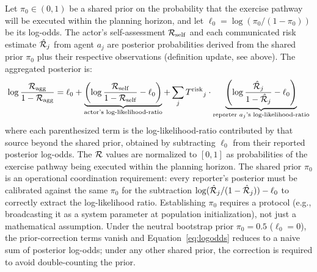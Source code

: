\begin{definition}
\label{def:logodds}
Let $\pi_0 \in (0, 1)$ be a shared prior on the probability that the
    exercise pathway will be executed within the planning horizon, and
    let $\ell_0 = \log(\pi_0 / (1 - \pi_0))$ be its log-odds. The
    actor's self-assessment $\mathcal{R}_{\mathrm{self}}$ and each communicated
    risk estimate $\hat{\mathcal{R}}_j$ from agent $a_j$ are posterior
    probabilities derived from the shared prior $\pi_0$ plus their
    respective observations (definition update, see above). The aggregated posterior is:
\begin{equation}
\label{eq:logodds}
\log \frac{\mathcal{R}_{\mathrm{agg}}}{1 - \mathcal{R}_{\mathrm{agg}}}
    = \ell_0
    + \underbrace{\left(\log \frac{\mathcal{R}_{\mathrm{self}}}{1 - \mathcal{R}_{\mathrm{self}}} - \ell_0\right)}_{\text{actor's log-likelihood-ratio}}
    + \sum_j {T^{\mathrm{risk}}}_j \cdot \underbrace{\left(\log \frac{\hat{\mathcal{R}}_j}{1 - \hat{\mathcal{R}}_j} - \ell_0\right)}_{\text{reporter $a_j$'s log-likelihood-ratio}}
\end{equation}
where each parenthesized term is the log-likelihood-ratio contributed
    by that source beyond the shared prior, obtained by subtracting
    $\ell_0$ from their reported posterior log-odds. The $\mathcal{R}$ values
    are normalized to $[0, 1]$ as probabilities of the exercise pathway
    being executed within the planning horizon. The shared prior
    $\pi_0$ is an operational coordination requirement: every
    reporter's posterior must be calibrated against the same $\pi_0$
    for the subtraction $\log(\hat{\mathcal{R}}_j / (1 - \hat{\mathcal{R}}_j))
    - \ell_0$ to correctly extract the log-likelihood ratio.
    Establishing $\pi_0$ requires a protocol (e.g., broadcasting it
    as a system parameter at population initialization), not just a
    mathematical assumption.
    Under the neutral
    bootstrap prior $\pi_0 = 0.5$ ($\ell_0 = 0$), the prior-correction
    terms vanish and Equation~\eqref{eq:logodds} reduces to a naive
    sum of posterior log-odds; under any other shared prior, the
    correction is required to avoid double-counting the prior.
\end{definition}

